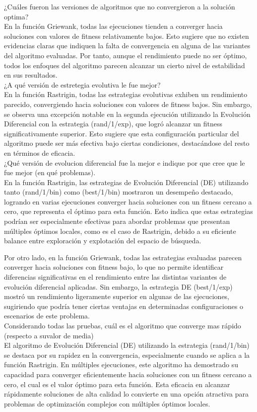 \documentclass{report}
\begin{document}
¿Cuáles fueron las versiones de algoritmos que no convergieron a la solución optima?\\
En la función Griewank, todas las ejecuciones tienden a converger hacia soluciones con valores de fitness relativamente bajos. Esto sugiere que no existen evidencias claras que indiquen la falta de convergencia en alguna de las variantes del algoritmo evaluadas. Por tanto, aunque el rendimiento puede no ser óptimo, todos los enfoques del algoritmo parecen alcanzar un cierto nivel de estabilidad en sus resultados.\\
¿A qué versión de estretegia evolutiva le fue mejor?\\
En la función Rastrigin, todas las estrategias evolutivas exhiben un rendimiento parecido, convergiendo hacia soluciones con valores de fitness bajos. Sin embargo, se observa una excepción notable en la segunda ejecución utilizando la Evolución Diferencial con la estrategia (rand/1/exp), que logró alcanzar un fitness significativamente superior. Esto sugiere que esta configuración particular del algoritmo puede ser más efectiva bajo ciertas condiciones, destacándose del resto en términos de eficacia.\\
¿Qué versión de evolucion diferencial fue la mejor e indique por que cree que le fue mejor (en qué problemas).\\
En la función Rastrigin, las estrategias de Evolución Diferencial (DE) utilizando tanto (rand/1/bin) como (best/1/bin) mostraron un desempeño destacado, logrando en varias ejecuciones converger hacia soluciones con un fitness cercano a cero, que representa el óptimo para esta función. Esto indica que estas estrategias podrían ser especialmente efectivas para abordar problemas que presentan múltiples óptimos locales, como es el caso de Rastrigin, debido a su eficiente balance entre exploración y explotación del espacio de búsqueda.

Por otro lado, en la función Griewank, todas las estrategias evaluadas parecen converger hacia soluciones con fitness bajo, lo que no permite identificar diferencias significativas en el rendimiento entre las distintas variantes de evolución diferencial aplicadas. Sin embargo, la estrategia DE (best/1/exp) mostró un rendimiento ligeramente superior en algunas de las ejecuciones, sugiriendo que podría tener ciertas ventajas en determinadas configuraciones o escenarios de este problema.\\

Considerando todas las pruebas, cuál es el algoritmo que converge mas rápido (respecto a suvalor de media)\\
El algoritmo de Evolución Diferencial (DE) utilizando la estrategia (rand/1/bin) se destaca por su rapidez en la convergencia, especialmente cuando se aplica a la función Rastrigin. En múltiples ejecuciones, este algoritmo ha demostrado su capacidad para converger eficientemente hacia soluciones con un fitness cercano a cero, el cual es el valor óptimo para esta función. Esta eficacia en alcanzar rápidamente soluciones de alta calidad lo convierte en una opción atractiva para problemas de optimización complejos con múltiples óptimos locales.\\
\end{document}
